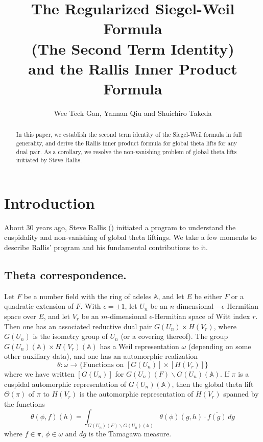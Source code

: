 \documentclass[10pt]{amsart}
\title[Siegel-Weil and Rallis]{The Regularized Siegel-Weil Formula \\
(The Second Term Identity)\\ and the Rallis Inner Product Formula}
\author{Wee Teck Gan, Yannan Qiu and Shuichiro Takeda}
\theoremstyle{plain}
\numberwithin{equation}{section}
\begin{document}
\maketitle
 
\begin{abstract}
In this paper, we establish the second term identity of the
Siegel-Weil formula in full generality, and derive the Rallis inner
product formula for global theta lifts for any dual pair. As a
corollary, we resolve the non-vanishing problem of global theta
lifts initiated by Steve Rallis.
\end{abstract}

\section{\bf Introduction}

About 30 years ago, Steve Rallis (\cite{R1,R2,R3}) initiated a program to
understand the cuspidality and non-vanishing of global theta
liftings. We take a few moments to describe Rallis' program and his
fundamental contributions to it.
\vskip 5pt

\subsection{\bf Theta correspondence.}
Let $F$ be a number field with the ring of adeles ${\mathbb{A}}$, and let $E$ be
either $F$ or a quadratic extension of $F$.  With $\epsilon = \pm1$,
let $U_n$ be an  $n$-dimensional $-\epsilon$-Hermitian space   over
$E$, and let $V_r$ be an
$m$-dimensional $\epsilon$-Hermitian space of Witt index $r$. 
Then one has an associated  reductive dual pair $G(U_n) \times
H(V_r)$, where $G(U_n)$ is the isometry group of $U_n$ (or a covering
thereof).    The group $G(U_n)({\mathbb{A}}) \times H(V_r)({\mathbb{A}})$ has a Weil
representation $\omega$ (depending on some other auxiliary data), and
one has an automorphic realization 
\[  
\theta:  \omega \longrightarrow \{\text{Functions on $[G(U_n)] \times
  [H(V_r)]$} \} 
\]
where we have written $[G(U_n)]$ for $G(U_n)(F) \backslash G(U_n)({\mathbb{A}})$.
If $\pi$ is a cuspidal automorphic representation of $G(U_n)({\mathbb{A}})$,
then the global theta lift $\Theta(\pi)$  of $\pi$ to $H(V_r)$ is the
automorphic representation of $H(V_r)$ spanned by the functions
\[  
\theta(\phi, f)(h) = \int_{G(U_{n})(F) \backslash G(U_{n})({\mathbb{A}})}
\theta(\phi)(g,h) \cdot \overline{f(g)} \, dg 
\]
where $f \in \pi$, $\phi \in \omega$ and $dg$ is the Tamagawa measure.  
\vskip 5pt
\end{document}
